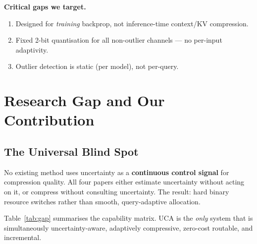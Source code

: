 \documentclass[11pt, a4paper]{article}
\begin{document}
\textbf{Critical gaps we target.}
\begin{enumerate}[leftmargin=*, itemsep=2pt]
  \item Designed for \textit{training} backprop, not inference-time context/KV compression.
  \item Fixed 2-bit quantisation for all non-outlier channels --- no per-input adaptivity.
  \item Outlier detection is static (per model), not per-query.
\end{enumerate}

\section{Research Gap and Our Contribution}
\label{sec:gap}

\subsection{The Universal Blind Spot}

\begin{gapbox}
No existing method uses uncertainty as a \textbf{continuous control signal} for compression quality. All four papers either estimate uncertainty without acting on it, or compress without consulting uncertainty. The result: hard binary resource switches rather than smooth, query-adaptive allocation.
\end{gapbox}

Table~\ref{tab:gap} summarises the capability matrix. UCA is the \textit{only} system that is simultaneously uncertainty-aware, adaptively compressive, zero-cost routable, and incremental.
\end{document}
